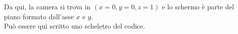 \documentclass[9pt,a4paper,twoside]{tau}
\begin{document}
Da qui, la camera si trova in $\left(x=0, y=0, z=1\right)$ e lo schermo è parte del piano formato dall'asse $x$ e $y$.\\
Può essere qui scritto uno scheletro del codice.



%
%
%
%    
%
%    
%    
%
%
%
%        
%
%
%		
%
%
\end{document}
